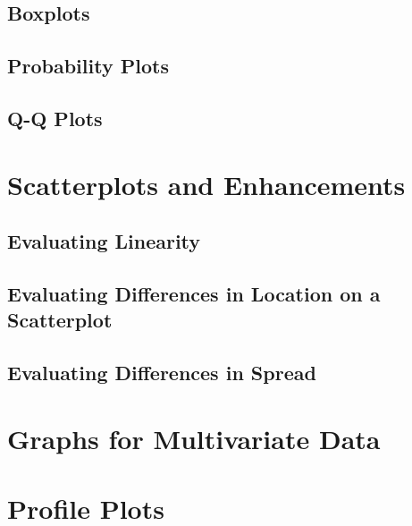 \documentclass[]{book}
\begin{document}
\hypertarget{boxplots-1}{%
\subsection{Boxplots}\label{boxplots-1}}

\hypertarget{probability-plots-1}{%
\subsection{Probability Plots}\label{probability-plots-1}}

\hypertarget{q-q-plots}{%
\subsection{Q-Q Plots}\label{q-q-plots}}

\hypertarget{scatterplots-and-enhancements}{%
\section{Scatterplots and Enhancements}\label{scatterplots-and-enhancements}}

\hypertarget{evaluating-linearity}{%
\subsection{Evaluating Linearity}\label{evaluating-linearity}}

\hypertarget{evaluating-differences-in-location-on-a-scatterplot}{%
\subsection{Evaluating Differences in Location on a Scatterplot}\label{evaluating-differences-in-location-on-a-scatterplot}}

\hypertarget{evaluating-differences-in-spread}{%
\subsection{Evaluating Differences in Spread}\label{evaluating-differences-in-spread}}

\hypertarget{graphs-for-multivariate-data}{%
\section{Graphs for Multivariate Data}\label{graphs-for-multivariate-data}}

\hypertarget{profile-plots}{%
\section{Profile Plots}\label{profile-plots}}
\end{document}
